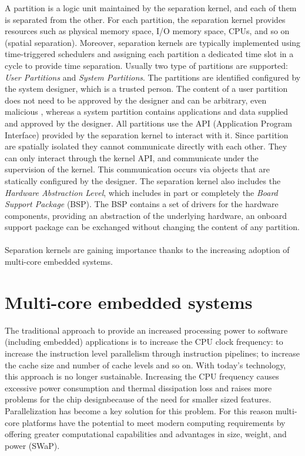 A partition is a logic unit maintained by the separation kernel, and each of them is separated from the other. For each partition, the separation kernel provides resources such as physical memory space, I/O memory space, CPUs, and so on (spatial separation). Moreover, separation kernels are typically implemented using time-triggered schedulers and assigning each partition a dedicated time slot in a cycle to provide time separation. Usually two type of partitions are supported: \emph{User Partitions} and \emph{System Partitions}. The partitions are identified configured by the system designer, which is a trusted person. The content of a user partition does not need to be approved by the designer and can be arbitrary, even malicious \cite{mils}, whereas a system partition contains applications and data supplied and approved by the designer. All partitions use the API (Application Program Interface) provided by the separation kernel to interact with it. Since partition are spatially isolated they cannot communicate directly with each other. They can only interact through the kernel API, and communicate under the supervision of the kernel. This communication occurs via objects that are statically configured by the designer. The separation kernel also includes the \emph{Hardware Abstraction Level}, which includes in part or completely the \emph{Board Support Package} (BSP). The BSP contains a set of drivers for the hardware components, providing an abstraction of the underlying hardware, an onboard support package can be exchanged without changing the content of any partition.

\paragraph{} Separation kernels are gaining importance thanks to the increasing adoption of multi-core embedded systems.


\section{Multi-core embedded systems}
The traditional approach to provide an increased processing power to software (including embedded) applications is to increase the CPU clock frequency: to increase the instruction level parallelism through instruction pipelines; to increase the cache size and number of cache levels and so on. With today's technology, this approach is no longer sustainable. Increasing the CPU frequency causes excessive power consumption and thermal dissipation loss and raises more problems for the chip designbecause of the need for smaller sized features. Parallelization has become a key solution for this problem. For this reason multi-core platforms have the potential to meet modern computing requirements by offering greater computational capabilities and advantages in size, weight, and power (SWaP). 

